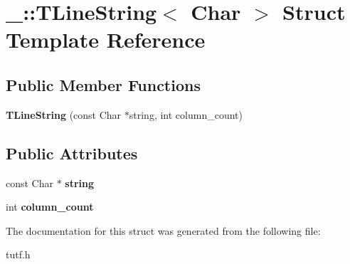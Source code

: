 \hypertarget{struct___1_1_t_line_string}{}\section{\+\_\+\+:\+:T\+Line\+String$<$ Char $>$ Struct Template Reference}
\label{struct___1_1_t_line_string}
\subsection*{Public Member Functions}
\begin{DoxyCompactItemize}
\item 
\mbox{\label{struct___1_1_t_line_string_ab3f2579c372c01dad25d4690d2c09729}} 
{\bfseries T\+Line\+String} (const Char $\ast$string, int column\+\_\+count)
\end{DoxyCompactItemize}
\subsection*{Public Attributes}
\begin{DoxyCompactItemize}
\item 
\mbox{\label{struct___1_1_t_line_string_af986867250068f36eca87444c77dd4f0}} 
const Char $\ast$ {\bfseries string}
\item 
\mbox{\label{struct___1_1_t_line_string_af5d1d906573cf24639e3ffbc4a1a7063}} 
int {\bfseries column\+\_\+count}
\end{DoxyCompactItemize}


The documentation for this struct was generated from the following file\+:\begin{DoxyCompactItemize}
\item 
tutf.\+h\end{DoxyCompactItemize}
